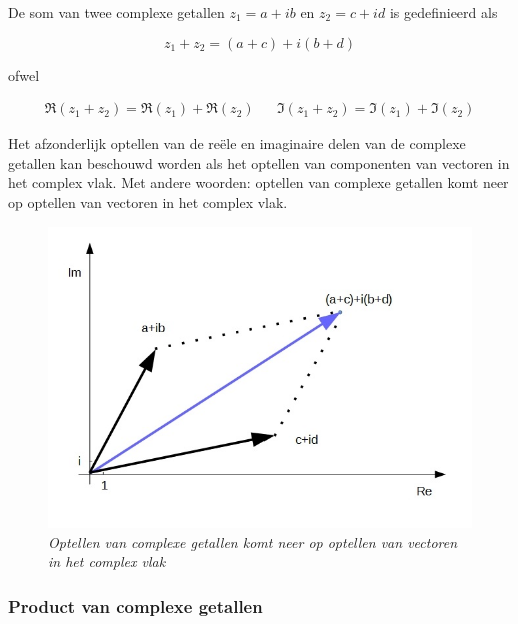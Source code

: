 De som van twee complexe getallen $z_{1}=a+ib$ en $z_{2}=c+id$ is gedefinieerd als\\

\begin{framed}
\[ z_{1}+z_{2}=(a+c)+i(b+d) \]
\end{framed}

ofwel

\begin{framed}
\[	
\begin{array}{ccc}
\Re(z_{1}+z_{2})=\Re(z_{1})+\Re(z_{2}) &  & \Im(z_{1}+z_{2})=\Im(z_{1})+\Im(z_{2}) 
\end{array} 
\]
\end{framed}

Het afzonderlijk optellen van de re\"{e}le en imaginaire delen van de complexe getallen kan beschouwd worden als het optellen van componenten van vectoren in het complex vlak. Met andere woorden: optellen van complexe getallen komt neer op optellen van vectoren in het complex vlak.\\

\begin{figure}[h]
	\begin{center}
		\includegraphics[scale=0.6]{3_gonio_complexe_getallen/inputs/complex-getal-3-optelling.jpg}
	\end{center}
\caption{\it Optellen van complexe getallen komt neer op optellen van vectoren in het complex vlak}
\end{figure}

\subsubsection{Product van complexe getallen}

